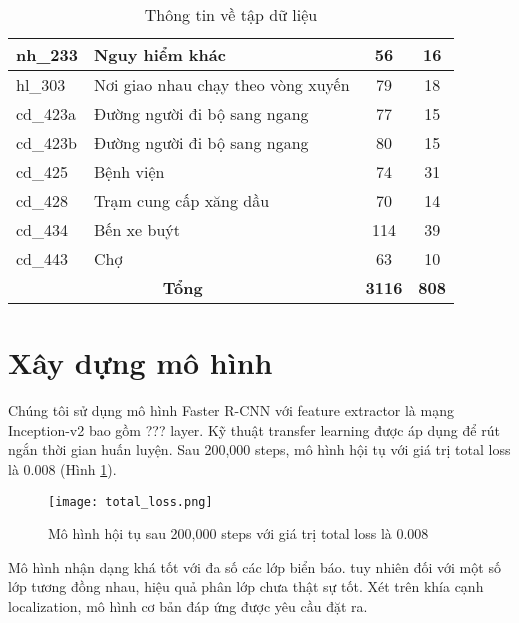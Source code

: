 \documentclass[../thesis.tex]{subfiles}
\begin{document}
\begin{table}[!htb]
\begin{longtable}{| l | l | c | c |}
	nh\_233 & Nguy hiểm khác & 56 & 16\\
	\hline
	hl\_303 & Nơi giao nhau chạy theo vòng xuyến & 79 & 18\\
	\hline
	cd\_423a & Đường người đi bộ sang ngang & 77 & 15\\
	\hline
	cd\_423b & Đường người đi bộ sang ngang & 80 & 15\\
	\hline
	cd\_425 & Bệnh viện & 74 & 31\\
	\hline
	cd\_428 & Trạm cung cấp xăng dầu & 70 & 14\\
	\hline
	cd\_434 & Bến xe buýt & 114 & 39\\
	\hline
	cd\_443 & Chợ & 63 & 10\\
	\hline
	\multicolumn{2}{|c|}{\textbf{Tổng}} & \textbf{3116} & \textbf{808}\\
	\hline
\end{longtable}
\caption{Thông tin về tập dữ liệu}
\label{Table:datset}
\end{table}

\section{Xây dựng mô hình}

Chúng tôi sử dụng mô hình Faster R-CNN với feature extractor là mạng Inception-v2 bao gồm ??? layer. Kỹ thuật transfer learning được áp dụng để rút ngắn thời gian huấn luyện.  Sau 200,000 steps, mô hình hội tụ với giá trị total loss là 0.008 (Hình \ref{Fig:total_loss.png}).

\begin{figure}[!htb]
	\centering
	\texttt{[image: total\_loss.png]}
	\caption{Mô hình hội tụ sau 200,000 steps với giá trị total loss là 0.008}\label{Fig:total_loss.png}
\end{figure}


Mô hình nhận dạng khá tốt với đa số các lớp biển báo. tuy nhiên đối với một số lớp tương đồng nhau, hiệu quả phân lớp chưa thật sự tốt. Xét trên khía cạnh localization, mô hình cơ bản đáp ứng được yêu cầu đặt ra.
\end{document}
